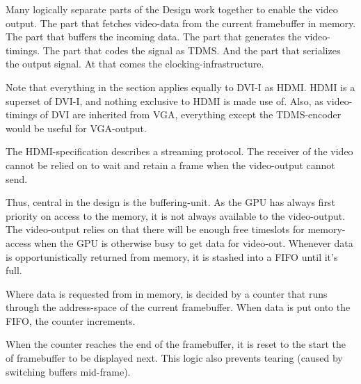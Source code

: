 \documentclass[../main/report.tex]{subfiles}
\begin{document}
Many logically separate parts of the Design work together to enable the video output.
The part that fetches video-data from the current framebuffer in memory.
The part that buffers the incoming data.
The part that generates the video-timings.
The part that codes the signal as TDMS.
And the part that serializes the output signal.
At that comes the clocking-infrastructure.

Note that everything in the section applies equally to DVI-I as HDMI. HDMI is a superset of DVI-I, and nothing exclusive to HDMI is made use of.
Also, as video-timings of DVI are inherited from VGA, everything except the TDMS-encoder would be useful for VGA-output.

The HDMI-specification describes a streaming protocol.
The receiver of the video cannot be relied on to wait and retain a frame when the video-output cannot send.

Thus, central in the design is the buffering-unit.
As the GPU has always first priority on access to the memory, it is not always available to the video-output.
The video-output relies on that there will be enough free timeslots for memory-access when the GPU is otherwise busy to get data for video-out.
Whenever data is opportunistically returned from memory, it is stashed into a FIFO until it's full.

Where data is requested from in memory, is decided by a counter that runs through the address-space of the current framebuffer.
When data is put onto the FIFO, the counter increments. %

When the counter reaches the end of the framebuffer, it is reset to the start the of framebuffer to be displayed next.
This logic also prevents tearing (caused by switching buffers mid-frame).
\end{document}

